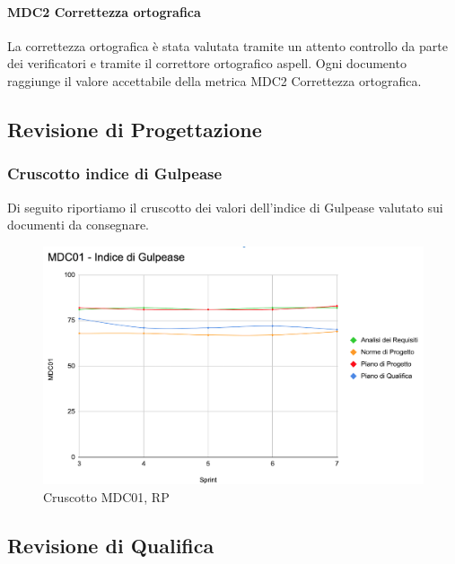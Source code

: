 \paragraph{MDC2 Correttezza ortografica}

La correttezza ortografica è stata valutata tramite un attento controllo da parte dei verificatori e tramite il correttore ortografico aspell.  Ogni documento raggiunge il valore accettabile della metrica MDC2 Correttezza ortografica. 
\newpage{}
\subsection{Revisione di Progettazione}
\subsubsection{Cruscotto indice di Gulpease}

Di seguito riportiamo il cruscotto dei valori dell'indice di Gulpease valutato sui documenti da consegnare.

\begin{figure}[H]
    \centering
    \includegraphics[scale = 0.55]{immagini/cruscottoRP.png}
    \caption{Cruscotto MDC01, RP}
\end{figure}

\newpage

\subsection{Revisione di Qualifica}
